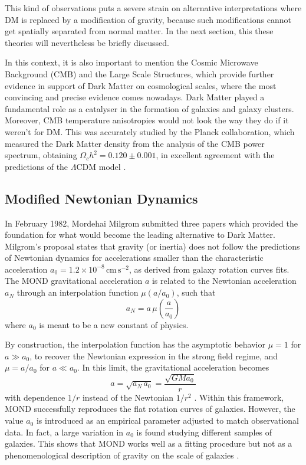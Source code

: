 This kind of observations puts a severe strain on alternative interpretations where DM is replaced by a modification of gravity, because such modifications cannot get spatially separated from normal matter. In the next section, this these theories will nevertheless be briefly discussed.

In this context, it is also important to mention the Cosmic Microwave Background (CMB) and the Large Scale Structures, which provide further evidence in support of Dark Matter on cosmological scales, where the most convincing and precise evidence comes nowadays.
Dark Matter played a fundamental role as a catalyser in the formation of galaxies and galaxy clusters. Moreover, CMB temperature anisotropies would not look the way they do if it weren't for DM. This was accurately studied by the Planck collaboration, which measured the Dark Matter density from the analysis of the CMB power spectrum, obtaining $\Omega_c h^2 = 0.120 \pm 0.001$, in excellent agreement with the predictions of the $\Lambda$CDM model \cite{Planck2018}.



\subsection{Modified Newtonian Dynamics}

In February 1982, Mordehai Milgrom submitted three papers \cite{Milgrom1983a,Milgrom1983b,Milgrom1983c} which provided the
foundation for what would become the leading alternative to Dark Matter. 
Milgrom's proposal states that gravity (or inertia) does
not follow the predictions of Newtonian dynamics for accelerations smaller than the characteristic acceleration $a_0 = 1.2 \times 10^{-8}\,\mathrm{cm\,s^{-2}}$, as derived from galaxy rotation curves fits.
The MOND gravitational acceleration $a$ is related to the Newtonian acceleration $a_N$ through an interpolation function $\mu(a/a_0)$, such that
\begin{equation}
    a_N = a\,\mu\left(\frac{a}{a_0}\right)
\end{equation}
where $a_0$ is meant to be a new constant of physics.

By construction, the interpolation function has the asymptotic behavior
$\mu = 1$ for $a \gg a_0$, to recover the Newtonian expression in the strong field regime, and $\mu = a/a_0$ for $a \ll a_0$.
In this limit, the gravitational acceleration becomes
\begin{equation}
    a = \sqrt{a_N\,a_0} = \frac{\sqrt{GM a_0}}{r}
\end{equation}
with dependence $1/r$ instead of the Newtonian $1/r^2$ \cite{Scarpa_2006}.
Within this framework, MOND successfully reproduces the flat rotation curves of galaxies. However, the value $a_0$ is introduced as an empirical parameter adjusted to match observational data. In fact, a large variation in $a_0$ is found studying different samples of galaxies. 
This shows that MOND works well as a fitting procedure but not as a phenomenological
description of gravity on the scale of galaxies \cite{a0}.

